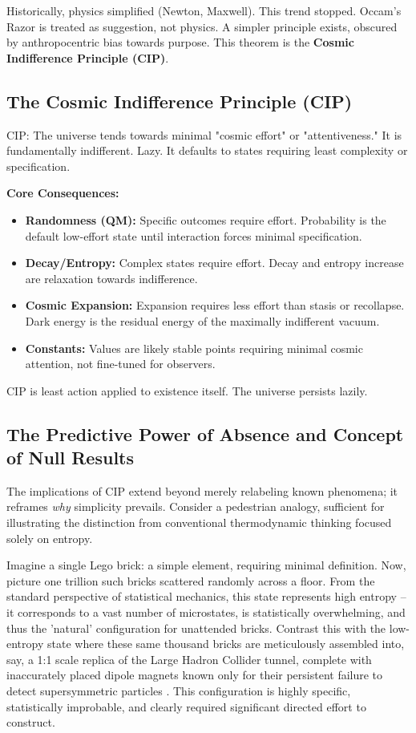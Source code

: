 \documentclass[11pt, a4paper]{article}
\begin{document}
Historically, physics simplified (Newton, Maxwell). This trend stopped. Occam's Razor \cite{Occam1347} is treated as suggestion, not physics. A simpler principle exists, obscured by anthropocentric bias towards purpose. This theorem is the \textbf{Cosmic Indifference Principle (CIP)}.

\subsection{The Cosmic Indifference Principle (CIP)}

CIP: The universe tends towards minimal "cosmic effort" or "attentiveness." It is fundamentally indifferent. Lazy. It defaults to states requiring least complexity or specification.

\pagebreak

\textbf{Core Consequences:}
\begin{itemize}
    \item \textbf{Randomness (QM):} Specific outcomes require effort. Probability is the default low-effort state until interaction forces minimal specification.
    \item \textbf{Decay/Entropy:} Complex states require effort. Decay and entropy increase are relaxation towards indifference.
    \item \textbf{Cosmic Expansion:} Expansion requires less effort than stasis or recollapse. Dark energy is the residual energy of the maximally indifferent vacuum.
    \item \textbf{Constants:} Values are likely stable points requiring minimal cosmic attention, not fine-tuned for observers.
\end{itemize}

CIP is least action \cite{FeynmanPathIntegral} applied to existence itself. The universe persists lazily.

\subsection{The Predictive Power of Absence and Concept of Null Results}

The implications of CIP extend beyond merely relabeling known phenomena; it reframes \textit{why} simplicity prevails. Consider a pedestrian analogy, sufficient for illustrating the distinction from conventional thermodynamic thinking focused solely on entropy.

Imagine a single Lego brick: a simple element, requiring minimal definition. Now, picture one trillion such bricks scattered randomly across a floor. From the standard perspective of statistical mechanics, this state represents high entropy – it corresponds to a vast number of microstates, is statistically overwhelming, and thus the 'natural' configuration for unattended bricks. Contrast this with the low-entropy state where these same thousand bricks are meticulously assembled into, say, a 1:1 scale replica of the Large Hadron Collider tunnel, complete with inaccurately placed dipole magnets known only for their persistent failure to detect supersymmetric particles \cite{SupersymmetrySearches}. This configuration is highly specific, statistically improbable, and clearly required significant directed effort to construct.
\end{document}
